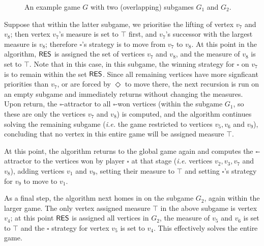 \documentclass{eptcs}
\newcommand{\odd}{\ensuremath{\square}\xspace}
\newcommand{\even}{\ensuremath{\Diamond}\xspace}
\newcommand{\ie}{\emph{i.e.}\xspace}
\begin{document}
\begin{figure}[h!tbp]
\caption{An example game $G$ with two (overlapping) subgames $G_1$ and $G_2$.}
\label{fig:illustrating_example}
\end{figure}

Suppose that within the latter subgame, we prioritise the lifting of
vertex $v_7$ and $v_8$; then vertex $v_7$'s measure is set to $\top$
first, and $v_7$'s successor with the largest measure is $v_8$;
therefore $\odd$'s strategy is to move from $v_7$ to $v_8$. At this
point in the algorithm, $\textsf{RES}$ is assigned the set of vertices $v_7$
and $v_8$, and the measure of $v_8$ is set to $\top$. Note that in this
case, in this subgame, the winning strategy for $\odd$ on $v_7$ is to remain within
the set $\textsf{RES}$. Since all
remaining vertices have more signficant priorities than $v_7$, or
are forced by $\even$ to move there, the next recursion is run on
an empty subgame and immediately returns without changing the
measures. Upon return, the $\odd$-attractor to all $\odd$-won
vertices (within the subgame $G_1$, so these are only the 
vertices $v_7$ and $v_8$)
is computed, and the algorithm continues solving the remaining
subgame (\ie the game restricted to vertices $v_5,v_6$ and $v_9$),
concluding that no vertex in this entire game will be assigned
measure $\top$.

At this point, the algorithm returns to the global game again and
computes the $\odd$-attractor to the vertices won by player $\odd$ at that stage
(\ie vertices $v_2,v_3,v_7$ and $v_8$), adding vertices $v_1$ and $v_9$,
setting their measure to $\top$ 
and setting $\odd$'s strategy for $v_9$ to move to $v_1$. 

As a final step, the algorithm next homes in on the subgame $G_2$,
again within the larger game.  The only vertex assigned measure
$\top$ in the above subgame is vertex $v_4$; at this point $\textsf{RES}$ is
assigned all vertices in $G_2$, the measure of $v_5$ and $v_6$ is set to
$\top$ and the $\odd$ strategy for vertex $v_5$ is set to $v_4$.
This effectively solves the entire game.
\end{document}
